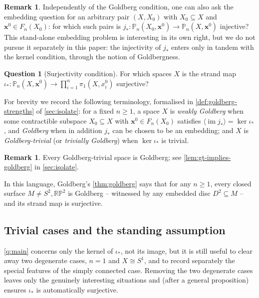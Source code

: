\documentclass[reqno]{amsart}
\theoremstyle{definition}
\newtheorem{remark}[theorem]{Remark}
\newtheorem{question}[theorem]{Question}
\newcommand\bfx{\mathbf{x}}
\newcommand{\PB}{\mathbb{P}}
\newcommand{\im}{\operatorname{im}}
\newcommand{\RP}{\mathbb{RP}}
\newcommand{\co}[1]{\mathopen{\langle}#1\mathclose{\rangle}} %
\newcommand{\base}{\bfx^0}
\numberwithin{equation}{section}
\begin{document}
\begin{remark}\label{rem:embedding-standalone}
Independently of the Goldberg condition, one can also ask the
embedding question for an arbitrary pair \((X, X_0)\) with
\(X_0\subseteq X\) and \(\base\in F_n(X_0)\): for which such pairs is
\(j_\ast\colon \PB_n(X_0,\base)\to \PB_n(X,\base)\) injective? This
stand-alone embedding problem is interesting in its own right,
but we do not pursue it separately in this paper: the
injectivity of \(j_\ast\) enters only in tandem with the kernel
condition, through the notion of Goldbergness.
\end{remark}

\begin{question}[Surjectivity condition]\label{q:surj-cond}
For which spaces \(X\) is the strand map
\(\iota_\ast\colon \PB_n(X,\base)\to\prod_{i=1}^n\pi_1(X,x^0_i)\) surjective?
\end{question}

For brevity we record the following terminology, formalised in
\cref{def:goldberg-strengths} of
\cref{sec:isolate}: for a fixed \(n\ge 1\), a space \(X\) is \emph{weakly Goldberg}
when some contractible subspace \(X_0\subseteq X\) with \(\base\in F_n(X_0)\)
satisfies \(\co{\im j_\ast} = \ker \iota_\ast\), and \emph{Goldberg} when in addition \(j_\ast\) can be chosen to be an
embedding; and \(X\) is \emph{Goldberg-trivial} (or
\emph{trivially Goldberg}) when \(\ker\iota_\ast\) is trivial.

\begin{remark}\label{rem:gt-implies-goldberg}
Every Goldberg-trivial space is Goldberg; see
\cref{lem:gt-implies-goldberg} in \cref{sec:isolate}.
\end{remark}

In this language, Goldberg's \cref{thm:goldberg} says that for any \(n\ge 1\),
every closed surface \(M\neq S^2,\RP^2\) is Goldberg -- witnessed by any embedded disc \(D^2\subseteq M\) -- and its strand map is surjective.

\subsection{Trivial cases and the standing assumption}
\label{ssec:dichotomy}

\cref{q:main} concerns only the kernel of \(\iota_\ast\), not
its image, but it is still useful to clear away two degenerate
cases, \(n=1\) and \(X\cong S^1\), and to record separately the
special features of the simply connected case. Removing the two
degenerate cases leaves only the genuinely interesting situations
and (after a general proposition) ensures \(\iota_\ast\) is
automatically surjective.
\end{document}
